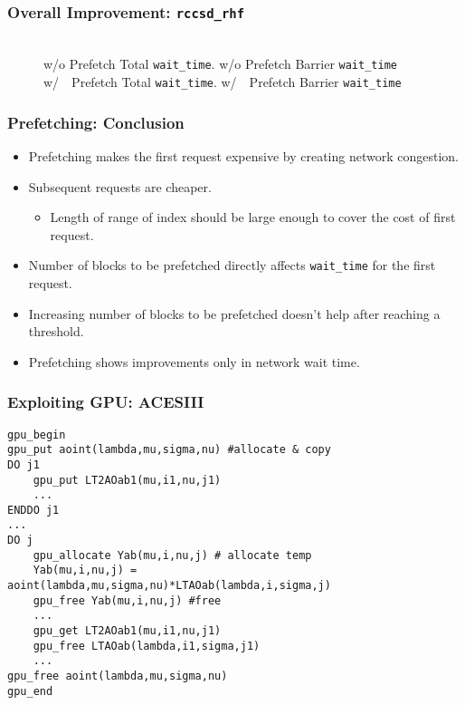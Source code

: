 \documentclass{beamer}
\begin{document}
\begin{frame}[fragile]
  \frametitle{Overall Improvement: \texttt{rccsd\_rhf}}
  \fontsize{7pt}{7.2}\selectfont
  \begin{figure}[h]
    \resizebox{.9\linewidth}{!}{}
    \\
     w/o Prefetch Total \texttt{wait\_time}.
     w/o Prefetch Barrier \texttt{wait\_time}
    \\
     w/~~Prefetch Total \texttt{wait\_time}.
      w/~~Prefetch Barrier \texttt{wait\_time}
  \end{figure}
\end{frame}

\begin{frame}[fragile]
  \frametitle{Prefetching: Conclusion}
  \begin{itemize}
  \item<2-4> Prefetching makes the first request expensive by creating network congestion.
  \item<3-4> Subsequent requests are cheaper.
    \begin{itemize}
    \item<4-4> Length of range of index should be large enough to cover the cost of
      first request.
    \end{itemize}
  \item<5-> Number of blocks to be prefetched directly affects \texttt{wait\_time} for the
    first request.
  \item<6-> Increasing number of blocks to be prefetched doesn't help after reaching a threshold.
  \item<7-> Prefetching shows improvements only in network wait time.
  \end{itemize}
\end{frame}

\begin{frame}[fragile=singleslide]\frametitle{Exploiting GPU: ACESIII}
\fontsize{7pt}{7.2}\selectfont
\begin{lstlisting}
gpu_begin
gpu_put aoint(lambda,mu,sigma,nu) #allocate & copy
DO j1
    gpu_put LT2AOab1(mu,i1,nu,j1)
    ...
ENDDO j1
...
DO j
    gpu_allocate Yab(mu,i,nu,j) # allocate temp
    Yab(mu,i,nu,j) = aoint(lambda,mu,sigma,nu)*LTAOab(lambda,i,sigma,j)
    gpu_free Yab(mu,i,nu,j) #free
    ...
    gpu_get LT2AOab1(mu,i1,nu,j1)
    gpu_free LTAOab(lambda,i1,sigma,j1)
    ...
gpu_free aoint(lambda,mu,sigma,nu)
gpu_end
\end{lstlisting}
\end{frame}
\end{document}
